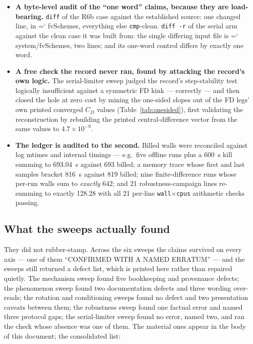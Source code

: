 \documentclass[11pt,a4paper]{article}
\newcommand{\artifact}[1]{{\small\ttfamily\hyphenchar\font=`\-\relax
  \def\_{\textunderscore\allowbreak}#1}}
\begin{document}
\begin{itemize}
\texttt{np.array\_equal}, for both levers --- verified the sign convention rather than
assuming it, and confirmed \emph{in code} that the instrument's operator is the matrix-free
AD product the KSP uses and never the assembled matrix dumped alongside it.
\item \textbf{A byte-level audit of the ``one word'' claims, because they are load-bearing.}
\texttt{diff} of the R6b case against the established source: one changed line, in
\artifact{fvSchemes}, everything else \texttt{cmp}-clean. \texttt{diff -r} of the serial arm
against the clean case it was built from: the single differing input file is
\artifact{system/fvSchemes}, two lines; and its one-word control differs by exactly one word.
\item \textbf{A free check the record never ran, found by attacking the record's own logic.}
The serial-limiter sweep judged the record's step-stability test logically insufficient
against a symmetric FD kink --- correctly --- and then closed the hole at zero cost by mining
the one-sided slopes out of the FD legs' own printed converged \(C_D\) values
(Table~\ref{tab:onesided}), first validating the reconstruction by rebuilding the printed
central-difference vector from the same values to \(4.7\times10^{-9}\).
\item \textbf{The ledger is audited to the second.} Billed walls were reconciled against log
mtimes and internal timings --- e.g.\ five offline runs plus a 600~s kill summing to 693.04~s
against 693 billed; a memory trace whose first and last samples bracket 816~s against 819
billed; nine finite-difference runs whose per-run walls sum to \emph{exactly} 642; and 21
robustness-campaign lines re-summing to exactly 128.28 with all 21 per-line
\texttt{wall}\(\times\)\texttt{cpus} arithmetic checks passing.
\end{itemize}

\subsection{What the sweeps actually found}

They did not rubber-stamp. Across the six sweeps the claims survived on every axis --- one of
them ``CONFIRMED WITH A NAMED ERRATUM'' --- and the sweeps still returned a defect list, which
is printed here rather than repaired quietly. The mechanism sweep found five bookkeeping and
provenance defects; the phenomenon sweep found two documentation defects and three wording
over-reads; the rotation and conditioning sweeps found no defect and two presentation caveats
between them; the robustness sweep found one factual error and named three protocol gaps; the
serial-limiter sweep found no error, named two, and ran the check whose absence was one of
them. The material ones appear in the body of this document; the consolidated list:
\end{document}
